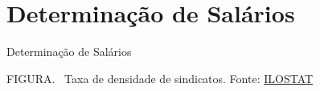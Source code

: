 \documentclass[10pt]{beamer}
\begin{document}
\section{Determinação de Salários}
\begin{frame}{Determinação de Salários}
    \begin{center}
		\begin{minipage}[b]{.55\textwidth}
			\tiny{{\scshape FIGURA}. \ Taxa de densidade de sindicatos. Fonte: \href{https://ilostat.ilo.org/topics/union-membership/}{ILOSTAT}} 
		\end{minipage}
	\end{center}
\end{frame}
\end{document}
